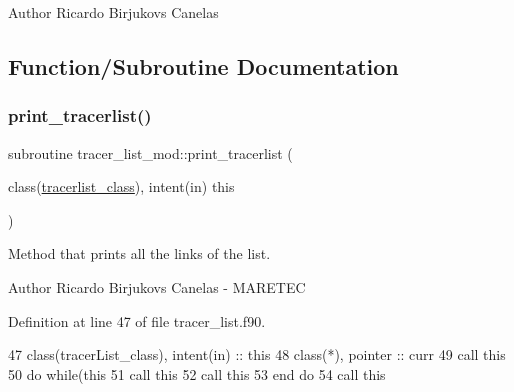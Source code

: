\begin{DoxyAuthor}{Author}
Ricardo Birjukovs Canelas 
\end{DoxyAuthor}


\subsection{Function/\+Subroutine Documentation}
\mbox{\label{namespacetracer__list__mod_a53919fa88a10347294eb6f2fccf072c7}} 
\subsubsection{\texorpdfstring{print\+\_\+tracerlist()}{print\_tracerlist()}}
{\footnotesize\ttfamily subroutine tracer\+\_\+list\+\_\+mod\+::print\+\_\+tracerlist (\begin{DoxyParamCaption}\item[{class(\mbox{\hyperlink{structtracer__list__mod_1_1tracerlist__class}{tracerlist\+\_\+class}}), intent(in)}]{this }\end{DoxyParamCaption})\hspace{0.3cm}{\ttfamily [private]}}



Method that prints all the links of the list. 

\begin{DoxyAuthor}{Author}
Ricardo Birjukovs Canelas -\/ M\+A\+R\+E\+T\+EC 
\end{DoxyAuthor}


Definition at line 47 of file tracer\+\_\+list.\+f90.


\begin{DoxyCode}
47     \textcolor{keywordtype}{class}(tracerList\_class), \textcolor{keywordtype}{intent(in)} :: this
48     \textcolor{keywordtype}{class}(*), \textcolor{keywordtype}{pointer} :: curr
49     \textcolor{keyword}{call }this%
50     \textcolor{keywordflow}{do} \textcolor{keywordflow}{while}(this%
51         \textcolor{keyword}{call }this%
52         \textcolor{keyword}{call }this%
53 \textcolor{keywordflow}{    end do}
54     \textcolor{keyword}{call }this%
\end{DoxyCode}
\mbox{\label{namespacetracer__list__mod_a8c123eab5e919438e71cfc0b3847d384}} 

